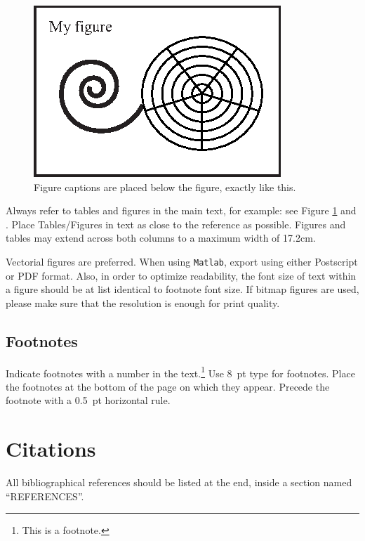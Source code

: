 \documentclass{article}
\begin{document}
\begin{figure}[h]
\centering
\includegraphics[width=0.9\columnwidth]{figure.eps}
\caption{Figure captions are placed below the figure, exactly like this.\label{fig:example}}
\end{figure}

Always refer to tables and figures in the main text, for example:
see Figure \ref{fig:example} and . 
Place Tables/Figures in text as close to the reference as possible.
Figures and tables may extend across both columns to a maximum width of 17.2cm.

Vectorial figures are preferred. 
When using {\texttt{Matlab}}, 
export using either Postscript or PDF format. 
Also, in order to optimize readability, the font size of text within a figure should be at list identical to footnote font size. If bitmap figures are used, please make sure that the resolution is enough for print quality. 

\subsection{Footnotes}
Indicate footnotes with a number in the text.\footnote{This is a footnote.}
Use 8~pt type for footnotes. Place the footnotes at the bottom of the page 
on which they appear. 
Precede the footnote with a 0.5~pt horizontal rule.


\section{Citations}
All bibliographical references should be listed at the end, inside a section named ``REFERENCES''.
\end{document}
